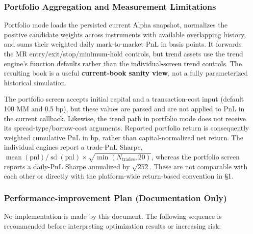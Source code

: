 \subsubsection{Portfolio Aggregation and Measurement Limitations}

Portfolio mode loads the persisted current Alpha snapshot, normalizes the positive
candidate weights across instruments with available overlapping history, and sums
their weighted daily mark-to-market PnL in basis points. It forwards the MR
entry/exit/stop/minimum-hold controls, but trend assets use the trend engine's
function defaults rather than the individual-screen trend controls. The resulting
book is a useful \textbf{current-book sanity view}, not a fully parameterized historical
simulation.

The portfolio screen accepts initial capital and a transaction-cost input (default
100 MM and 0.5 bp), but these values are parsed and are not applied to PnL in the
current callback. Likewise, the trend path in portfolio mode does not receive its
spread-type/borrow-cost arguments. Reported portfolio return is consequently
weighted cumulative PnL in bp, rather than capital-normalized net return. The
individual engines report a trade-PnL Sharpe,
$\operatorname{mean}(\mathrm{pnl})/\operatorname{sd}(\mathrm{pnl})\times\sqrt{\min(N_{\mathrm{trades}},20)}$,
whereas the portfolio screen reports a daily-PnL Sharpe annualized by
$\sqrt{252}$. These are not comparable with each other or directly with the
platform-wide return-based convention in \S1.

\subsubsection{Performance-improvement Plan (Documentation Only)}

No implementation is made by this document. The following sequence is recommended
before interpreting optimization results or increasing risk:


